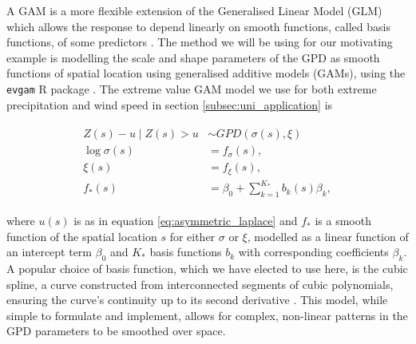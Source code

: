 \documentclass{article}
\numberwithin{equation}{section}
\begin{document}
A GAM is a more flexible extension of the Generalised Linear Model (GLM) which allows the response to depend linearly on smooth functions, called basis functions, of some predictors \citep{Wood2006}.
The method we will be using for our motivating example is modelling the scale and shape parameters of the GPD as smooth functions of spatial location using generalised additive models (GAMs), using the \texttt{evgam} R package \citep{Youngman2022}.
The extreme value GAM model we use for both extreme precipitation and wind speed in section \ref{subsec:uni_application} is
\begin{center}
  \begin{align} \label{eq:gpd_gam}
    \begin{split}
      Z(s) - u \mid Z(s) > u &\sim GPD(\sigma(s), \xi) \\
      \log{\sigma(s)} &= f_{\sigma}(s), \\
              \xi(s) &= f_{\xi}(s), \\
              f_*(s) &= \beta_0 + \sum_{k=1}^{K_*}b_k(s)\beta_k,
    \end{split}
  \end{align}
\end{center}
where $u(s)$ is as in equation \ref{eq:asymmetric_laplace} and $f_*$ is a smooth function of the spatial location $s$ for either $\sigma$ or $\xi$, modelled as a linear function of an intercept term $\beta_0$ and $K_*$ basis functions $b_k$ with corresponding coefficients $\beta_k$. 
A popular choice of basis function, which we have elected to use here, is the cubic spline, a curve constructed from interconnected segments of cubic polynomials, ensuring the curve's continuity up to its second derivative \citep{Wood2006}. 
This model, while simple to formulate and implement, allows for complex, non-linear patterns in the GPD parameters to be smoothed over space.
\end{document}
